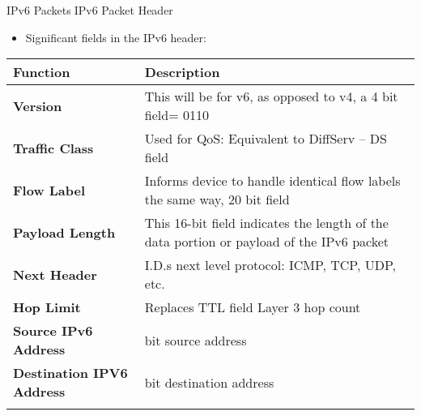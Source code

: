 \documentclass[
  ignorenonframetext,
]{beamer}
\providecommand{\tightlist}{%
  \setlength{\itemsep}{0pt}\setlength{\parskip}{0pt}}
\begin{document}
\begin{frame}{IPv6 PacketsIPv6 Packet Header}
\label{ipv6-packets-ipv6-packet-header}
\begin{itemize}
\tightlist
\item
  Significant fields in the IPv6 header:
\end{itemize}

\begin{longtable}[]{@{}
  >{\centering\arraybackslash}p{}
  >{\centering\arraybackslash}p{}@{}}
\toprule\noalign{}
\begin{minipage}[b]{\linewidth}\centering
Function
\end{minipage} & \begin{minipage}[b]{\linewidth}\centering
Description
\end{minipage} \\
\midrule\noalign{}
\endhead
\textbf{Version} & This will be for v6, as opposed to v4, a 4 bit field=
0110 \\
\textbf{Traffic Class} & Used for QoS: Equivalent to DiffServ -- DS
field \\
\textbf{Flow Label} & Informs device to handle identical flow labels the
same way, 20 bit field \\
\textbf{Payload Length} & This 16-bit field indicates the length of the
data portion or payload of the IPv6 packet \\
\textbf{Next Header} & I.D.s next level protocol: ICMP, TCP, UDP,
etc. \\
\textbf{Hop Limit} & Replaces TTL field Layer 3 hop count \\
\textbf{Source IPv6 Address} & 128 bit source address \\
\textbf{Destination IPV6 Address} & 128 bit destination address \\
\bottomrule\noalign{}
\end{longtable}

\end{frame}
\end{document}
